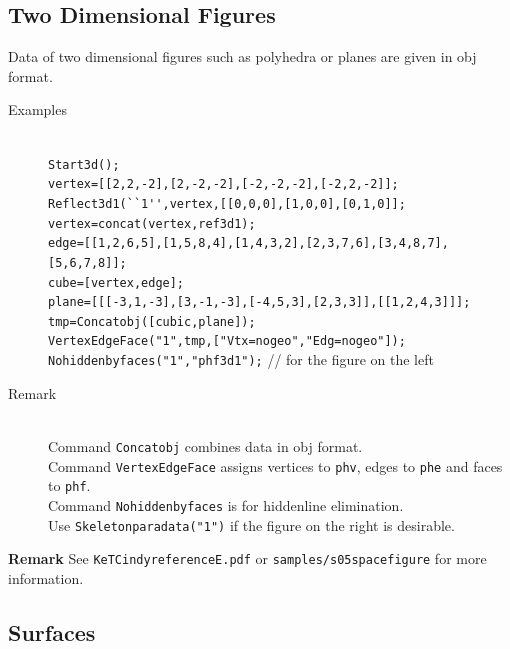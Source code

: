 \documentclass[papersize,a4paper,12pt]{article}
\begin{document}
\subsection{Two Dimensional Figures}

Data of two dimensional figures such as polyhedra or planes are given in obj format.

\begin{description}
\item[Examples]\mbox{}\\
\verb|Start3d();|\\
\verb|vertex=[[2,2,-2],[2,-2,-2],[-2,-2,-2],[-2,2,-2]];|\\
\verb|Reflect3d1(``1'',vertex,[[0,0,0],[1,0,0],[0,1,0]];|\\
\verb|vertex=concat(vertex,ref3d1);|\\
\verb|edge=[[1,2,6,5],[1,5,8,4],[1,4,3,2],[2,3,7,6],[3,4,8,7],[5,6,7,8]];|\\
\verb|cube=[vertex,edge];|\\
\verb|plane=[[[-3,1,-3],[3,-1,-3],[-4,5,3],[2,3,3]],[[1,2,4,3]]];|\\
\verb|tmp=Concatobj([cubic,plane]);|\\
\verb|VertexEdgeFace("1",tmp,["Vtx=nogeo","Edg=nogeo"]);|\\
\verb|Nohiddenbyfaces("1","phf3d1");| // for the figure on the left

\item[Remark]\mbox{}\\
Command \verb|Concatobj| combines data in obj format.\\
Command \verb|VertexEdgeFace| assigns vertices to {\tt phv}, edges to {\tt phe} and faces to {\tt phf}.\\
Command \verb|Nohiddenbyfaces| is for hiddenline elimination.\\
Use \verb|Skeletonparadata("1")| if the figure on the right is desirable.
\end{description}

\vspace{-10mm}

\begin{center}
\hspace{10mm}
\end{center}

\noindent
{\bf Remark} See \verb|KeTCindyreferenceE.pdf| or \verb|samples/s05spacefigure| for more information.

\subsection{Surfaces}
\end{document}
